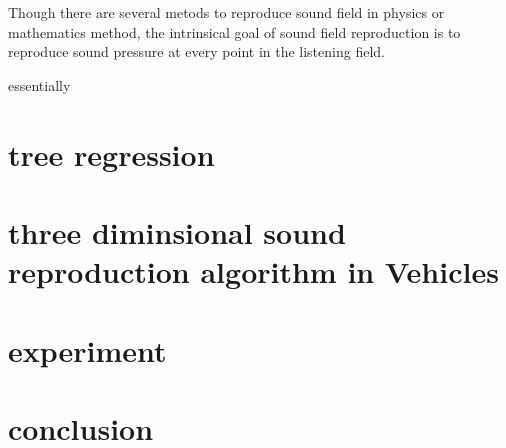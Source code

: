 \documentclass[runningheads,a4paper]{llncs}
\begin{document}
Though there are several metods to reproduce sound field in physics or mathematics method, the intrinsical goal of sound field reproduction is to reproduce sound pressure at every point in the listening field. 


essentially


\section{tree regression}\label{sec:regression}

\section{three diminsional sound reproduction algorithm in Vehicles}\label{sec:algorithm}

\section{experiment}\label{sec:experiment}

\section{conclusion}\label{sec:conclusion}

\label{bib:bibliography}



\end{document}
